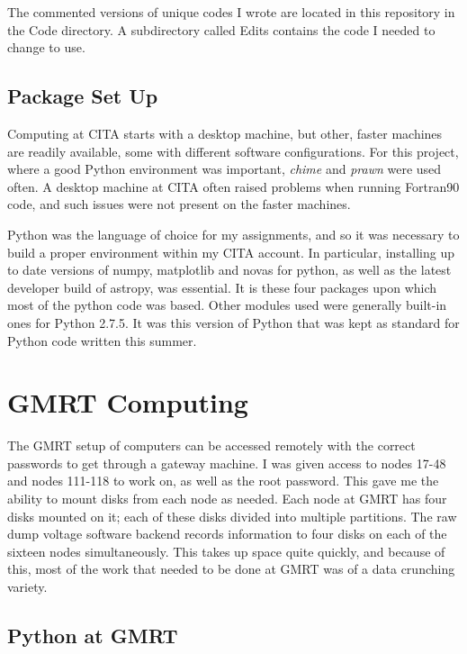 \documentclass[a4paper,12pt]{article}
\begin{document}
The commented versions of unique codes I wrote are located in this repository in the Code directory. A subdirectory called Edits contains the code I needed to change to use.

\subsection{Package Set Up}
\label{sec:packagesetup}

Computing at CITA starts with a desktop machine, but other, faster machines are readily available, some with different software configurations. For this project, where a good Python environment was important, \emph{chime} and \emph{prawn} were used often. A desktop machine at CITA often raised problems when running Fortran90 code, and such issues were not present on the faster machines.

Python was the language of choice for my assignments, and so it was necessary to build a proper environment within my CITA account. In particular, installing up to date versions of numpy, matplotlib and novas for python, as well as the latest developer build of astropy, was essential. It is these four packages upon which most of the python code was based. Other modules used were generally built-in ones for Python 2.7.5. It was this version of Python that was kept as standard for Python code written this summer.

\section{GMRT Computing}
\label{sec:gmrtcomputing}

The GMRT setup of computers can be accessed remotely with the correct passwords to get through a gateway machine. I was given access to nodes 17-48 and nodes 111-118 to work on, as well as the root password. This gave me the ability to mount disks from each node as needed. Each node at GMRT has four disks mounted on it; each of these disks divided into multiple partitions. The raw dump voltage software backend records information to four disks on each of the sixteen nodes simultaneously. This takes up space quite quickly, and because of this, most of the work that needed to be done at GMRT was of a data crunching variety.

\subsection{Python at GMRT}
\label{sec:pythonatgmrt}
\end{document}

